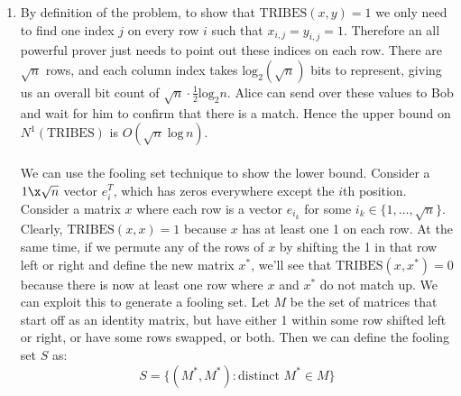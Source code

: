 \documentclass{article}
\begin{document}
\begin{enumerate}
\begin{enumerate}[label=(\alph*)]
            \item By definition of the problem, to show that
                $\textrm{TRIBES}(x,y) = 1$ we only need to find one index $j$
                on every row $i$ such that $x_{i,j} = y_{i,j} = 1$. Therefore
                an all powerful prover just needs to point out these indices on
                each row. There are $\sqrt{n}$ rows, and each column index
                takes $\textrm{log}_2 (\sqrt{n})$ bits to represent, giving us
                an overall bit count of $\sqrt{n} \cdot \frac{1}{2}
                \textrm{log}_2 n$. Alice can send over these values to Bob and
                wait for him to confirm that there is a match. Hence the upper
                bound on $N^1(\textrm{TRIBES})$ is $O(\sqrt{n}\;\textrm{log}\,
                n)$.
                \\\\
                We can use the fooling set technique to show the lower bound.
                Consider a $1\x\sqrt{n}$ vector $e_i^T$, which has zeros
                everywhere except the $i$th position. Consider a matrix $x$
                where each row is a vector $e_{i_k}$ for some $i_k \in \{ 1,
                \ldots, \sqrt{n} \}$. Clearly, $\textrm{TRIBES}(x, x) = 1$
                because $x$ has at least one 1 on each row. At the same time,
                if we permute any of the rows of $x$ by shifting the 1 in that
                row left or right and define the new matrix $x^*$, we'll see
                that $\textrm{TRIBES}(x, x^*) = 0$ because there is now at
                least one row where $x$ and $x^*$ do not match up. We can
                exploit this to generate a fooling set. Let $M$ be the set of
                matrices that start off as an identity matrix, but have either
                1 within some row shifted left or right, or have some rows
                swapped, or both. Then we can define the fooling set $S$ as:
                $$ S = \{ (M^*, M^*): \textrm{distinct } M^* \in M \} $$


\end{enumerate}
\end{enumerate}
\end{document}
